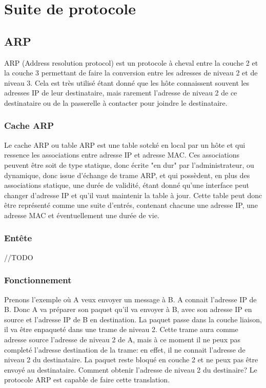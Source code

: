 \documentclass[twoside,openright,a4paper,11pt,french]{article}
\begin{document}
\section{Suite de protocole}

\subsection{ARP}
ARP (Address resolution protocol) est un protocole à cheval entre la couche 2 et
la couche 3 permettant de faire la conversion entre les adresses de niveau 2 et de niveau 3.
Cela est très utilisé étant donné que les hôte connaissent souvent les adresses IP de leur destinataire,
mais rarement l'adresse de niveau 2 de ce destinataire ou de la passerelle à contacter pour joindre
le destinataire.

\subsubsection{Cache ARP}
Le cache ARP ou table ARP est une table sotcké en local par un hôte et qui ressence les associations entre adresse IP et adresse MAC.
Ces associations peuvent être soit de type statique, donc écrite "en dur" par l'administrateur, ou dynamique, donc issue d'échange de trame ARP,
et qui possèdent, en plus des associations statique, une durée de validité, étant donné qu'une interface peut changer d'adresse IP et qu'il vaut
maintenir la table à jour.
Cette table peut donc être représenté comme une suite d'entrés, contenant chacune une adresse IP, une adresse MAC et éventuellement une durée de vie.

\subsubsection{Entête}
//TODO


\subsubsection{Fonctionnement}
Prenons l'exemple où A veux envoyer un message à B. A connait l'adresse IP de
B. Donc A va préparer son paquet qu'il va envoyer à B, avec son adresse IP en
source et l'adresse IP de B en destination. La paquet passe dans la couche
liaison, il va être enpaqueté dans une trame de niveau 2. Cette trame aura
comme adresse source l'adresse de niveau 2 de A, mais à ce moment il ne peux
pas completé l'adresse destination de la trame: en effet, il ne connait
l'adresse de niveau 2 du destinataire. La paquet reste bloqué en couche 2 et ne
peux pas être envoyé au destinataire. Comment obtenir l'adresse de niveau 2 du destinaire?
Le protocole ARP est capable de faire cette translation.
\end{document}
